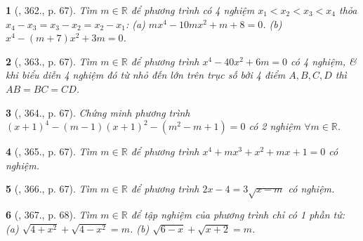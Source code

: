 \documentclass{article}
\newtheorem{baitoan}{}
\begin{document}
\begin{baitoan}[\cite{Binh_Toan_9_tap_2}, 362., p. 67]
	Tìm $m\in\mathbb{R}$ để phương trình có 4 nghiệm $x_1 < x_2 < x_3 < x_4$ thỏa $x_4 - x_3 = x_3 - x_2 = x_2 - x_1$: (a) $mx^4 - 10mx^2 + m + 8 = 0$. (b) $x^4 - (m + 7)x^2 + 3m = 0$.
\end{baitoan}

\begin{baitoan}[\cite{Binh_Toan_9_tap_2}, 363., p. 67]
	Tìm $m\in\mathbb{R}$ để phương trình $x^4 - 40x^2 + 6m = 0$ có 4 nghiệm, \& khi biểu diễn 4 nghiệm đó từ nhỏ đến lớn trên trục số bởi 4 điểm $A,B,C,D$ thì $AB = BC = CD$.
\end{baitoan}

\begin{baitoan}[\cite{Binh_Toan_9_tap_2}, 364., p. 67]
	Chứng minh phương trình $(x + 1)^4 - (m - 1)(x + 1)^2 - (m^2 - m + 1) = 0$ có 2 nghiệm $\forall m\in\mathbb{R}$.
\end{baitoan}

\begin{baitoan}[\cite{Binh_Toan_9_tap_2}, 365., p. 67]
	Tìm $m\in\mathbb{R}$ để phương trình $x^4 + mx^3 + x^2 + mx + 1 = 0$ có nghiệm.
\end{baitoan}

\begin{baitoan}[\cite{Binh_Toan_9_tap_2}, 366., p. 67]
	Tìm $m\in\mathbb{R}$ để phương trình $2x - 4 = 3\sqrt{x - m}$ có nghiệm.
\end{baitoan}

\begin{baitoan}[\cite{Binh_Toan_9_tap_2}, 367., p. 68]
	Tìm $m\in\mathbb{R}$ để tập nghiệm của phương trình chỉ có 1 phần tử: (a) $\sqrt{4 + x^2} + \sqrt{4 - x^2} = m$. (b) $\sqrt{6 - x} + \sqrt{x + 2} = m$.
\end{baitoan}

\end{document}
